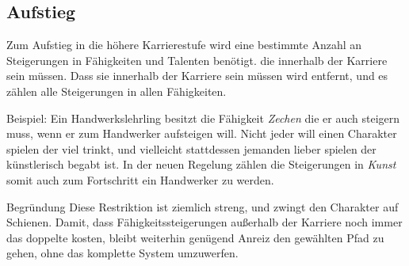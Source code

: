 \documentclass[a4paper,10pt,twoside,twocolumn,openany,nodeprecatedcode,bg=print]{dndbook}
\begin{document}
\subsection{Aufstieg}
Zum Aufstieg in die höhere Karrierestufe wird eine bestimmte Anzahl an Steigerungen in Fähigkeiten und Talenten benötigt. die innerhalb der Karriere sein müssen.
Dass sie innerhalb der Karriere sein müssen wird entfernt, und es zählen alle Steigerungen in allen Fähigkeiten.

Beispiel: Ein Handwerkslehrling besitzt die Fähigkeit \textit{Zechen} die er auch steigern muss, wenn er zum Handwerker aufsteigen will. Nicht jeder will einen Charakter spielen der viel trinkt, und vielleicht stattdessen jemanden lieber spielen der künstlerisch begabt ist. In der neuen Regelung zählen die Steigerungen in \textit{Kunst} somit auch zum Fortschritt ein Handwerker zu werden.

\begin{DndComment}{Begründung}
  Diese Restriktion ist ziemlich streng, und zwingt den Charakter auf Schienen. Damit, dass Fähigkeitssteigerungen außerhalb der Karriere noch immer das doppelte kosten, bleibt weiterhin genügend Anreiz den gewählten Pfad zu gehen, ohne das komplette System umzuwerfen.
\end{DndComment}


\clearpage


\end{document}
